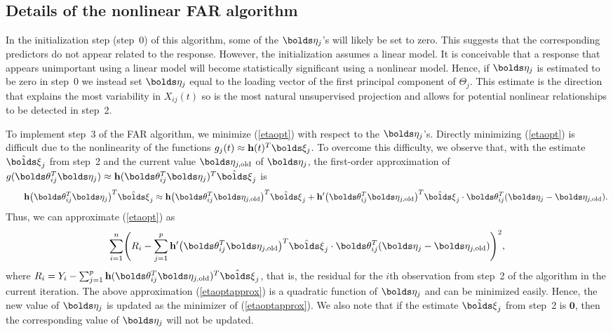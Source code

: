 \documentclass[aos,MSNbibl,dvips]{arximspdf}
\newcommand{\btheta}{\bolds\theta}
\newcommand{\bfeta}{\bolds\eta}
\newcommand{\bxi}{\bolds\xi}
\newcommand{\bh}{{\mathbf h}}
\newcommand{\bzero}{\mathbf{0}}
\newcommand{\hbxi}{\hat{\bxi}}
\begin{document}
\begin{appendix}
\section{Details of the nonlinear FAR algorithm}\label{stepA}
In the initialization step (step~0) of this algorithm, some of the
$\bfeta_j$'s will likely be set to zero. This suggests that the
corresponding predictors do not appear related to the response.
However, the initialization assumes a linear model. It is conceivable
that a response that appears unimportant using a linear model will
become statistically significant using a nonlinear model. Hence, if
$\bfeta_j$ is estimated to be zero in step~0 we instead set $\bfeta
_j$ equal to the loading vector of the first principal component of
$\Theta_j$. This estimate is the direction that explains the most
variability in $X_{ij}(t)$ so is the most natural unsupervised
projection and allows for potential nonlinear relationships to be
detected in step~2.

To implement step~3 of the FAR algorithm, we minimize (\ref{etaopt})
with respect to the $\bfeta_j$'s. Directly minimizing (\ref{etaopt})
is difficult due to the nonlinearity of the functions $g_j(t)\approx
\bh(t)^T\bxi_j$. To overcome this difficulty, we observe that, with
the estimate $\hbxi_j$ from step~2 and the current value $\bfeta
_{j,\mathrm{old}}$ of $\bfeta_j$, the first-order approximation of $g(\btheta
_{ij}^T\bfeta_j)\approx\bh(\btheta_{ij}^T\bfeta_j)^T\hbxi_j$ is
%
\begin{equation}
\label{eqhapprox} \qquad\bh\bigl(\btheta_{ij}^T\bfeta_j
\bigr)^T\hbxi_j\approx\bh\bigl(\btheta
_{ij}^T\bfeta_{j,\mathrm{old}}\bigr)^T
\hbxi_j + \bh'\bigl(\btheta_{ij}^T
\bfeta_{j,\mathrm{old}}\bigr)^T\hbxi_j \cdot
\btheta_{ij}^T(\bfeta_j-\bfeta_{j,\mathrm{old}}).
\end{equation}
%
Thus, we can approximate (\ref{etaopt}) as
%
\begin{equation}
\label{etaoptapprox} \sum_{i=1}^n
\Biggl(R_i - \sum_{j=1}^p
\bh'\bigl(\btheta_{ij}^T\bfeta_{j,\mathrm{old}}
\bigr)^T\hbxi_j \cdot\btheta_{ij}^T(
\bfeta_j-\bfeta_{j,\mathrm{old}}) \Biggr)^2,
\end{equation}
%
where\vspace*{1pt} $R_i = Y_i - \sum_{j=1}^p \bh(\btheta_{ij}^T\bfeta
_{j,\mathrm{old}})^T\hbxi_j $, that is, the residual for the $i$th observation
from step~2 of the algorithm in the current iteration. The above
approximation (\ref{etaoptapprox}) is a quadratic function of $\bfeta
_j$ and can be minimized easily. Hence, the new value of $\bfeta_j$ is
updated as the minimizer of (\ref{etaoptapprox}). We also note that if
the estimate $\hbxi_j$ from step~2 is $\bzero$, then the
corresponding value of $\bfeta_j$ will not be updated.


\end{appendix}
\end{document}
